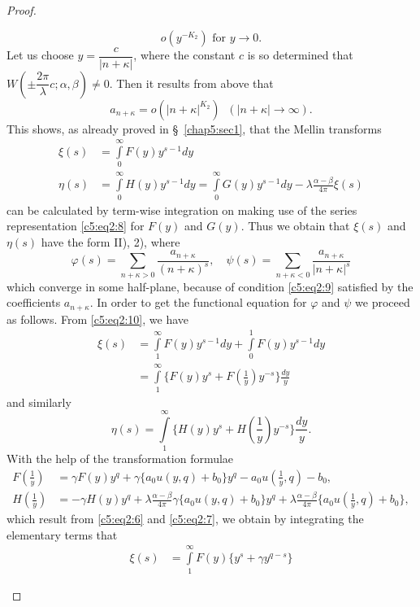 \begin{proof}
\begin{enumerate}
$$o(y^{-K_2}) \text{ for } y \to 0.
$$
Let us choose $y=\dfrac{c}{|n+\kappa|}$, where the constant $c$ is so
determined that $W(\pm \dfrac{2\pi}{\lambda} c;\alpha,\beta)\neq
0$. Then it results from above that
\begin{equation*}
a_{n+\kappa} =  o(|n+\kappa|^{K_2}) 
\;\; (|n+\kappa| \to \infty). \tag{9}\label{c5:eq2:9} 
\end{equation*}
This \pageoriginale shows, as already proved in \S~\ref{chap5:sec1}, that the Mellin
transforms 
\begin{align*}
\xi(s) & = \int\limits^{\infty}_0 F(y) y^{s-1} dy \tag{10}\label{c5:eq2:10}\\
\eta(s) & = \int\limits^{\infty}_0 H(y)y^{s-1} dy =
\int\limits^{\infty}_0 G(y) y^{s-1} dy -\lambda \frac{\alpha
  -\beta}{4\pi} \xi (s)
\end{align*}
can be calculated by term-wise integration on making use of the series
representation \eqref{c5:eq2:8} for $F(y)$ and $G(y)$. Thus we obtain that $\xi(s)$
and $\eta(s)$ have the form II), 2), where 
$$
\varphi(s) = \sum_{n+\kappa>0} \frac{a_{n+\kappa}}{(n+\kappa)^s},
\quad \psi (s) = \sum_{n+\kappa<0} \frac{a_{n+\kappa}}{|n+\kappa|^s}
$$
which converge in some half-plane, because of condition \eqref{c5:eq2:9} satisfied
by the coefficients $a_{n+\kappa}$. In order to get the functional
equation for $\varphi$ and $\psi$ we proceed  as follows. 
From \eqref{c5:eq2:10}, we have 
\begin{align*}
\xi(s) & = \int\limits^{\infty}_1 F(y) y^{s-1} dy + \int\limits^1_0
F(y) y^{s-1} dy\\
& = \int\limits^{\infty}_1 \{F(y) y^s + F(\frac{1}{y}) y^{-s}\}
\frac{dy}{y} 
\end{align*}
and similarly
$$
\eta(s) = \int\limits^{\infty}_1 \{H(y) y^s + H(\frac{1}{y}) y^{-s}\}
\frac{dy}{y}. 
$$
With the help of the transformation formulae
{\fontsize{9}{11}\selectfont
\begin{align*}
F(\frac{1}{y}) & = \gamma F(y) y^q+ \gamma\{a_0 u(y,q)+b_0\}y^q - a_0
u(\frac{1}{y},q) - b_0,\\
H(\frac{1}{y}) & = -\gamma H(y)y^q + \lambda \frac{\alpha-\beta}{4\pi}
\gamma\{a_0u(y,q) +b_0\} y^q + \lambda \frac{\alpha-\beta}{4\pi} \{a_0
u(\frac{1}{y},q) + b_0\}, 
\end{align*}}\relax
which result from \eqref{c5:eq2:6} and \eqref{c5:eq2:7}, 
we obtain by integrating the elementary terms that 
{\fontsize{9}{11}\selectfont
\begin{align*}
\xi(s) & = \int\limits^{\infty}_1 F(y) \{y^s+\gamma y^{q-s}\}

\end{align*}}
\end{enumerate}
\end{proof}
